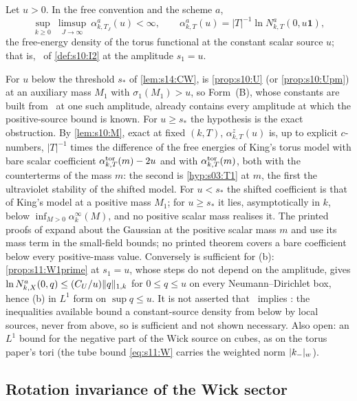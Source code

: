 \begin{hypothesis}\label{hyp:s23:Bminus}
Let $u>0$. In the free convention and the scheme $a$,
\[
\sup_{k\ge0}\ \limsup_{J\to\infty}\ \alpha^a_{k,T_J}(u)<\infty,\qquad\alpha^a_{k,T}(u)=|T|^{-1}\ln N^a_{k,T}(0,u\mathbf 1),
\]
the free-energy density of the torus functional at the constant scalar source $u$; that is, \Itwo\ of \cref{def:s10:I2} at the amplitude $s_1=u$.
\end{hypothesis}

For $u$ below the threshold $s_*$ of \cref{lem:s14:CW},  is \cref{prop:s10:U} (or \cref{prop:s10:Upm}) at an auxiliary mass $M_1$ with $\sigma_1(M_1)>u$, so Form~(B), whose constants are built from \Itwo\ at one such amplitude, already contains every amplitude at which the positive-source bound is known. For $u\ge s_*$ the hypothesis is the exact obstruction. By \cref{lem:s10:M}, exact at fixed $(k,T)$, $\alpha^z_{k,T}(u)$ is, up to explicit $c$-numbers, $|T|^{-1}$ times the difference of the free energies of King's torus model with bare scalar coefficient $\alpha^{\rm tor}_{k,T}(m)-2u$ and with $\alpha^{\rm tor}_{k,T}(m)$, both with the counterterms of the mass $m$: the second is \cref{hyp:s03:T1} at $m$, the first the ultraviolet stability of the shifted model. For $u<s_*$ the shifted coefficient is that of King's model at a positive mass $M_1$; for $u\ge s_*$ it lies, asymptotically in $k$, below $\inf_{M>0}\alpha^\infty_k(M)$, and no positive scalar mass realises it. The printed proofs of \cite{Ba1,Ba2} expand about the Gaussian at the positive scalar mass $m$ and use its mass term in the small-field bounds; no printed theorem covers a bare coefficient below every positive-mass value. Conversely  is sufficient for \Wtwo(b): \cref{prop:s11:W1prime} at $s_1=u$, whose steps do not depend on the amplitude, gives $\ln N^a_{k,X}(0,q)\le(C_U/u)\lVert q\rVert_{1,k}$ for $0\le q\le u$ on every Neumann--Dirichlet box, hence \Wtwo(b) in $L^1$ form on $\sup q\le u$. It is not asserted that \Wtwo\ implies : the inequalities available bound a constant-source density from below by local sources, never from above, so  is sufficient and not shown necessary. Also open: an $L^1$ bound for the negative part of the Wick source on cubes, as on the torus paper's tori (the tube bound \eqref{eq:s11:W} carries the weighted norm $\lvert k_-\rvert_{w}$).

\subsection{Rotation invariance of the Wick sector}

